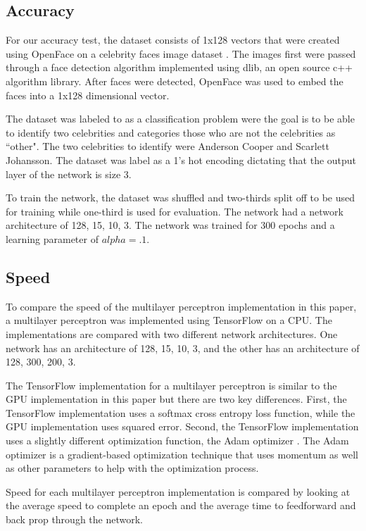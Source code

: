 \documentclass[jair, twoside,11pt,theapa]{article}
\begin{document}
\subsection{Accuracy}
For our accuracy test, the dataset consists of 1x128 vectors that were created using OpenFace \cite{openface} on a celebrity faces image dataset \cite{celebrityFaces}. 
The images first were passed through a face detection algorithm implemented using dlib, an open source c++ algorithm library. 
After faces were detected, OpenFace was used to embed the faces into a 1x128 dimensional vector. 

The dataset was labeled to as a classification problem were the goal is to be able to identify two celebrities and categories those who are not the celebrities as ``other".
The two celebrities to identify were Anderson Cooper and Scarlett Johansson. 
The dataset was label as a 1's hot encoding dictating that the output layer of the network is size 3. 

To train the network, the dataset was shuffled and two-thirds split off to be used for training while one-third is used for evaluation. 
The network had a network architecture of 128, 15, 10, 3. 
The network was trained for 300 epochs and a learning parameter of $alpha = .1$. 

\subsection{Speed}
To compare the speed of the multilayer perceptron implementation in this paper, a multilayer perceptron was implemented using TensorFlow on a CPU. 
The implementations are compared with two different network architectures. 
One network has an architecture of 128, 15, 10, 3, and the other has an architecture of 128, 300, 200, 3. 

The TensorFlow implementation for a multilayer perceptron is similar to the GPU implementation in this paper but there are two key differences. 
First, the TensorFlow implementation uses a softmax cross entropy loss function, while the GPU implementation uses squared error. 
Second, the TensorFlow implementation uses a slightly different optimization function, the Adam optimizer \cite{AdamOptimizer}. 
The Adam optimizer is a gradient-based optimization technique that uses momentum as well as other parameters to help with the optimization process.  

Speed for each multilayer perceptron implementation is compared by looking at the average speed to complete an epoch and the average time to feedforward and back prop through the network. 
\end{document}
